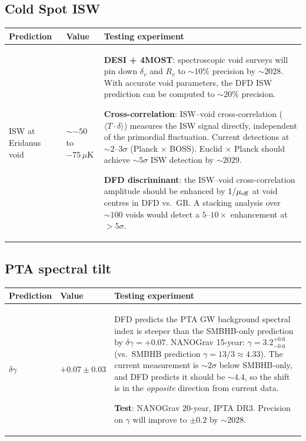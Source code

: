 \documentclass[11pt]{article}
\newcommand{\mufd}{\mu}
\begin{document}
\subsection{Cold Spot ISW}

\begin{table}[H]
\centering
\begin{tabular}{p{3cm}p{3cm}p{6cm}}
\toprule
\textbf{Prediction} & \textbf{Value} & \textbf{Testing experiment} \\
\midrule
ISW at Eridanus void & $\sim -50$ to $-75\,\mu$K &
  \textbf{DESI + 4MOST}: spectroscopic void surveys will pin down
  $\delta_v$ and $R_v$ to $\sim 10\%$ precision by $\sim 2028$. With
  accurate void parameters, the DFD ISW prediction can be computed to
  $\sim 20\%$ precision.

  \textbf{Cross-correlation}: ISW--void cross-correlation
  ($\langle T \cdot \delta \rangle$) measures the ISW signal directly,
  independent of the primordial fluctuation. Current detections at
  $\sim 2$--$3\sigma$ (Planck $\times$ BOSS). Euclid $\times$ Planck
  should achieve $\sim 5\sigma$ ISW detection by $\sim 2029$.

  \textbf{DFD discriminant}: the ISW--void cross-correlation amplitude
  should be enhanced by $1/\mufd_{\rm eff}$ at void centres in DFD
  vs.\ GR. A stacking analysis over $\sim 100$ voids would detect a
  $5$--$10\times$ enhancement at $>5\sigma$. \\
\bottomrule
\end{tabular}
\end{table}

\subsection{PTA spectral tilt}

\begin{table}[H]
\centering
\begin{tabular}{p{3cm}p{3cm}p{6cm}}
\toprule
\textbf{Prediction} & \textbf{Value} & \textbf{Testing experiment} \\
\midrule
$\delta\gamma$ & $+0.07 \pm 0.03$ &
  DFD predicts the PTA GW background spectral index is steeper than
  the SMBHB-only prediction by $\delta\gamma = +0.07$.
  NANOGrav 15-year: $\gamma = 3.2^{+0.6}_{-0.6}$ (vs.\ SMBHB prediction
  $\gamma = 13/3 \approx 4.33$). The current measurement is $\sim 2\sigma$
  below SMBHB-only, and DFD predicts it should be $\sim 4.4$, so the
  shift is in the \emph{opposite} direction from current data.

  \textbf{Test}: NANOGrav 20-year, IPTA DR3. Precision on $\gamma$ will
  improve to $\pm 0.2$ by $\sim 2028$. \\
\bottomrule
\end{tabular}
\end{table}
\end{document}
